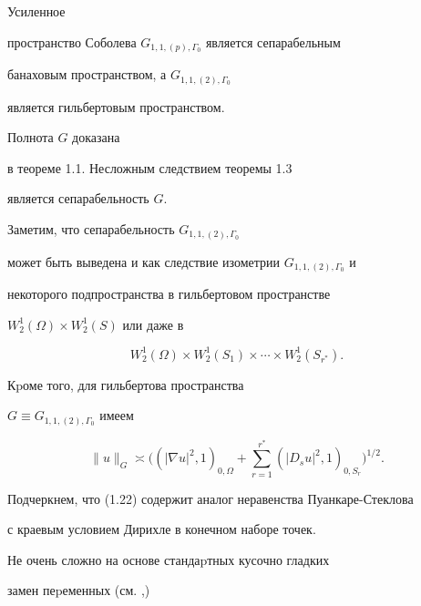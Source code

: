 \begin{thmm} Усиленное


пространство Соболева $G_{1,1,(p),\Gamma_0}$ является сепарабельным


 банаховым пространс\-твом, а $G_{1,1,(2),\Gamma_0}$


является гильбертовым пространством.


\end{thmm}





\begin{pf} Полнота $G$ доказана


в теореме 1.1. Несложным следствием теоремы 1.3


является сепарабельность $G$.


\end{pf}





Заметим, что сепарабельность $G_{1,1,(2),\Gamma_0}$


может быть выведена и как следствие изометрии $G_{1,1,(2),\Gamma_0}$ и


некоторого подпространства в гильбертовом пространстве


$W_2^1(\Omega)\times W_2^1(S)$ или даже в


$$


W_2^1(\Omega)\times W_2^1(S_1)\times\dotsb\times W_2^1(S_{r^*}).


$$


Кpоме того, для гильбертова пространства


$G\equiv G_{1,1,(2),\Gamma_0}$ имеем


\begin{equation}


\|u\|_G\asymp\bigl((|\nabla u|^2,1)_{0,\Omega}+


 \sum_{r=1}^{r^*} (|D_s u|^2,1)_{0,S_r} \bigr)^{1/2}.


\end{equation}


Подчеркнем, что (1.22) содержит аналог неравенства Пуанкаре-Стеклова


с краевым условием Дирихле в конечном наборе точек.





Не очень сложно на основе стандаpтных кусочно гладких


замен пеpеменных (см. \cite{Dy1},\cite{Dy2})


